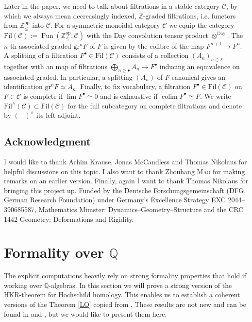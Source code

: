 \documentclass[10pt, reqno]{amsart}
\theoremstyle{definition}
\theoremstyle{remark}
\newcommand{\Q}{\mathbb{Q}}
\newcommand{\Z}{\mathbb{Z}}
\newcommand{\op}{\mathrm{op}}
\newcommand{\C}{\mathcal{C}}
\DeclareMathOperator{\colim}{\mathrm{colim}}
\newcommand{\Fil}{\mathrm{Fil}}
\newcommand{\gr}{\mathrm{gr}}
\newcommand{\Day}{\mathrm{Day}}
\DeclareMathOperator{\Fun}{\mathrm{Fun}}
\begin{document}
Later in the paper, we need to talk about filtrations in a stable category $\C$, by which we always mean decreasingly indexed, $\Z$-graded filtrations, i.e. functors from $\Z_\leq^\op$ into $\C$. For a symmetric monoidal category $\C$ we equip the category $\Fil(\C):=\Fun(\Z_\leq^\op,\C)$ with the Day convolution tensor product $\otimes^\Day$. The $n$-th associated graded $\gr^n F$ of $F$ is given by the cofibre of the map $F^{n+1}\to F^{n}$. A splitting of a filtration $F^\bullet\in\Fil(\C)$ consists of a collection $(A_n)_{n\in\Z}$ together with an map of filtrations $\bigoplus_{n\geq\bullet}A_n\to F^\bullet$ inducing an equivalence on associated graded. In particular, a splitting $(A_n)$ of $F$ canonical gives an identification $\gr^n F\simeq A_n$.
Finally, to fix vocabulary, a filtration $F^\bullet\in\Fil(\C)$ on $F\in\C$ is complete if $\lim F^\bullet\simeq 0$ and is exhaustive if $\colim F^\bullet\simeq F$. We write $\Fil^\wedge(\C)\subset \Fil(\C)$ for the full subcategory on complete filtrations and denote by $(-)^\wedge$ its left adjoint.

\subsection{Acknowledgment}
I would like to thank Achim Krause, Jonas McCandless and Thomas Nikolaus for helpful discussions on this topic. I also want to thank Zhouhang \textsc{Mao} for making remarks on an earlier version. Finally, again I want to thank Thomas Nikolaus for bringing this project up. Funded by the Deutsche Forschungsgemeinschaft (DFG, German Research Foundation) under Germany’s Excellence Strategy EXC
2044–390685587, Mathematics Münster: Dynamics–Geometry–Structure and the CRC 1442 Geometry: Deformations and Rigidity.




\section{Formality over \texorpdfstring{$\Q$}{Q}}\label{formal section}

The explicit computations heavily rely on strong formality properties that hold if working over $\Q$-algebras. In this section we will prove a strong version of the HKR-theorem for Hochschild homology. This enables us to establish a coherent versions of the Theorem \ref{LQ} copied from \cite{LQ84}. These results are not new and can be found in \cite{TV11} and \cite{MRT22}, but we would like to present them here.
\end{document}
